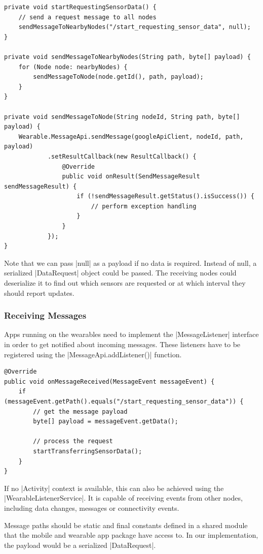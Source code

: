 \begin{lstlisting}[label=sendmessage]
private void startRequestingSensorData() {
	// send a request message to all nodes
	sendMessageToNearbyNodes("/start_requesting_sensor_data", null);
}

private void sendMessageToNearbyNodes(String path, byte[] payload) {
	for (Node node: nearbyNodes) {
		sendMessageToNode(node.getId(), path, payload);
	}
}

private void sendMessageToNode(String nodeId, String path, byte[] payload) {
	Wearable.MessageApi.sendMessage(googleApiClient, nodeId, path, payload)
			.setResultCallback(new ResultCallback() {
				@Override
				public void onResult(SendMessageResult sendMessageResult) {
					if (!sendMessageResult.getStatus().isSuccess()) {
						// perform exception handling
					}
				}
			});
}
\end{lstlisting}

Note that we can pass |null| as a payload if no data is required.
Instead of null, a serialized |DataRequest| object could be passed.
The receiving nodes could deserialize it to find out which sensors are requested or at which interval they should report updates.

\clearpage

\subsubsection{Receiving Messages}
\label{sec:implementation:transferringdata:receive}

Apps running on the wearables need to implement the |MessageListener|\cite{androiddocs:messagelistener} interface in order to get notified about incoming messages. These listeners have to be registered using the |MessageApi.addListener()| function.

\begin{lstlisting}[label=receivemessage]
@Override
public void onMessageReceived(MessageEvent messageEvent) {
    if (messageEvent.getPath().equals("/start_requesting_sensor_data")) {
        // get the message payload
        byte[] payload = messageEvent.getData();

        // process the request
        startTransferringSensorData();
    }
}
\end{lstlisting}

If no |Activity| context is available, this can also be achieved using the \\|WearableListenerService|\cite{androiddocs:wearablelistenerservice}.
It is capable of receiving events from other nodes, including data changes, messages or connectivity events.

Message paths should be static and final constants defined in a shared module that the mobile and wearable app package have access to. In our implementation, the payload would be a serialized |DataRequest|.

\clearpage